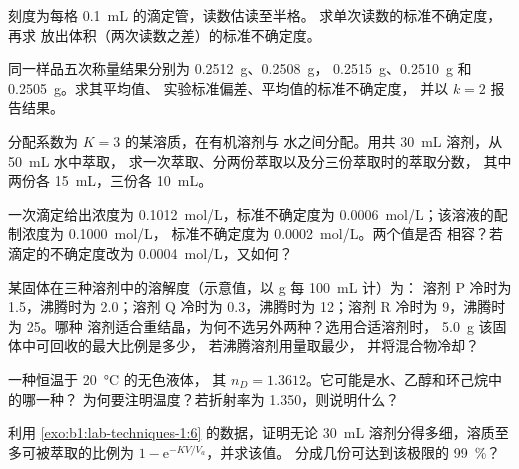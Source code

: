 \begin{exercise}[$\star$]\label{exo:b1:lab-techniques-1:4}
刻度为每格 \qty{0.1}{mL} 的滴定管，读数估读至半格。
求单次读数的标准不确定度，再求
放出体积（两次读数之差）的标准不确定度。
\end{exercise}

\begin{exercise}[$\star\star$]\label{exo:b1:lab-techniques-1:5}
同一样品五次称量结果分别为 \qty{0.2512}{g}、\qty{0.2508}{g}，
\qty{0.2515}{g}、\qty{0.2510}{g} 和 \qty{0.2505}{g}。求其平均值、
实验标准偏差、平均值的标准不确定度，
并以 $k = 2$ 报告结果。
\end{exercise}

\begin{exercise}[$\star\star$]\label{exo:b1:lab-techniques-1:6}
分配系数为 $K = 3$ 的某溶质，在有机溶剂与
水之间分配。用共 \qty{30}{mL} 溶剂，从 \qty{50}{mL} 水中萃取，
求一次萃取、分两份萃取以及分三份萃取时的萃取分数，
其中两份各 \qty{15}{mL}，三份各 \qty{10}{mL}。
\end{exercise}

\begin{exercise}[$\star\star$]\label{exo:b1:lab-techniques-1:7}
一次滴定给出浓度为 \qty{0.1012}{mol/L}，标准不确定度为
\qty{0.0006}{mol/L}；该溶液的配制浓度为 \qty{0.1000}{mol/L}，
标准不确定度为 \qty{0.0002}{mol/L}。两个值是否
相容？若滴定的不确定度改为
\qty{0.0004}{mol/L}，又如何？
\end{exercise}

\begin{exercise}[$\star\star$]\label{exo:b1:lab-techniques-1:8}
某固体在三种溶剂中的溶解度（示意值，以 \unit{g} 每 \qty{100}{mL} 计）为：
溶剂 P 冷时为 1.5，沸腾时为 2.0；溶剂
Q 冷时为 0.3，沸腾时为 12；溶剂 R 冷时为 9，沸腾时为 25。哪种
溶剂适合重结晶，为何不选另外两种？选用合适溶剂时，
\qty{5.0}{g} 该固体中可回收的最大比例是多少，
若沸腾溶剂用量取最少，
并将混合物冷却？
\end{exercise}

\begin{exercise}[$\star\star$]\label{exo:b1:lab-techniques-1:9}
一种恒温于 \qty{20}{\celsius} 的无色液体，
其 $n_D = 1.3612$。它可能是水、乙醇和环己烷中的哪一种？
为何要注明温度？若折射率为 1.350，则说明什么？
\end{exercise}

\begin{exercise}[$\star\star\star$]\label{exo:b1:lab-techniques-1:10}
利用 \cref{exo:b1:lab-techniques-1:6} 的数据，证明无论
\qty{30}{mL} 溶剂分得多细，溶质至多可被萃取的比例为
$1 - \mathrm{e}^{-KV/V_a}$，并求该值。
分成几份可达到该极限的 \qty{99}{\percent}？
\end{exercise}


